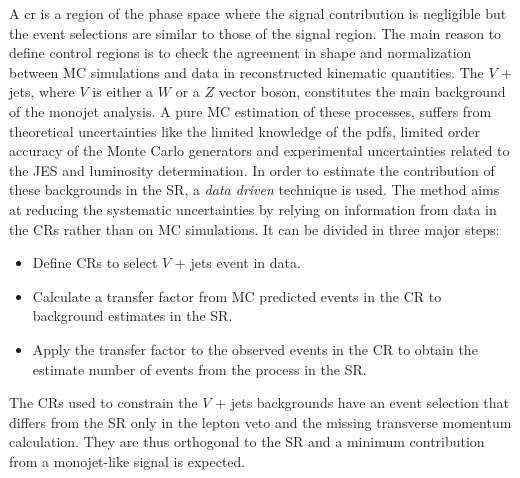 A \gls{cr} is a region of the phase space where the signal contribution is
negligible but the event selections are similar to those of the signal
region. The main reason to define control regions is to check the agreement in
shape and normalization between MC simulations and data in reconstructed
kinematic quantities. The $V$ + jets, where $V$ is either a $W$ or a $Z$ vector
boson, constitutes the main background of the monojet analysis. A pure MC
estimation of these processes, suffers from theoretical uncertainties like the
limited knowledge of the \glspl{pdf}, limited order accuracy of the Monte Carlo
generators and experimental uncertainties related to the JES and luminosity
determination. In order to estimate the contribution of these backgrounds in the
SR, a \emph{data driven} technique is used. The method aims at reducing the
systematic uncertainties by relying on information from data in the CRs rather
than on MC simulations. It can be divided in three major steps:
\begin{itemize}
\item Define CRs to select $V$ + jets event in data.
\item Calculate a transfer factor from MC predicted events in the CR to
  background estimates in the SR\@.
\item Apply the transfer factor to the observed events in the CR to obtain the
  estimate number of events from the process in the SR\@.
\end{itemize}
The CRs used to constrain the $V$ + jets backgrounds have an event selection
that differs from the SR only in the lepton veto and the missing transverse
momentum calculation. They are thus orthogonal to the SR and a minimum
contribution from a monojet-like signal is expected.

